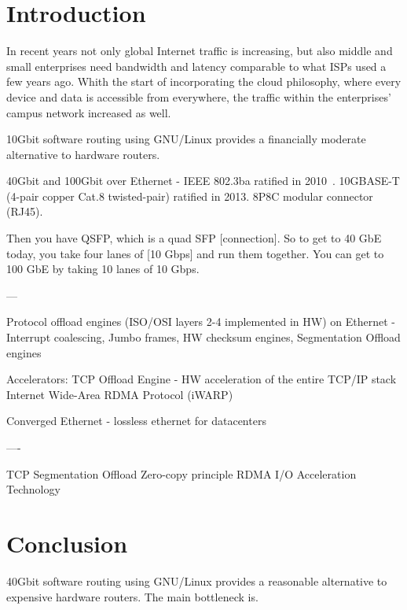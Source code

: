 
\chapter{Introduction}
In recent years not only global Internet traffic is increasing, but also middle and small enterprises
need bandwidth and latency comparable to what ISPs used a few years ago.
Whith the start of incorporating the cloud philosophy, where every device and data is accessible from everywhere,
the traffic within the enterprises' campus network increased as well.

10Gbit software routing using GNU/Linux provides a financially moderate alternative to hardware routers.




40Gbit and 100Gbit over Ethernet - IEEE 802.3ba ratified in 2010~\cite{ieee-802.3ba}.
10GBASE-T (4-pair copper Cat.8 twisted-pair) ratified in 2013.
8P8C modular connector (RJ45).

Then you have QSFP, which is a quad SFP [connection].
So to get to 40 GbE today, you take four lanes of [10 Gbps] and run them together.
You can get to 100 GbE by taking 10 lanes of 10 Gbps.

---

Protocol offload engines (ISO/OSI layers 2-4 implemented in HW)
on Ethernet - %
Interrupt coalescing, Jumbo frames, HW checksum engines, Segmentation Offload engines

Accelerators:
TCP Offload Engine - HW acceleration of the entire TCP/IP stack
Internet Wide-Area RDMA Protocol (iWARP)

Converged Ethernet - lossless ethernet for datacenters


----

TCP Segmentation Offload
Zero-copy principle
RDMA
I/O Acceleration Technology













\chapter{Conclusion}
40Gbit software routing using GNU/Linux provides a reasonable alternative to expensive hardware routers.
The main bottleneck is. %
